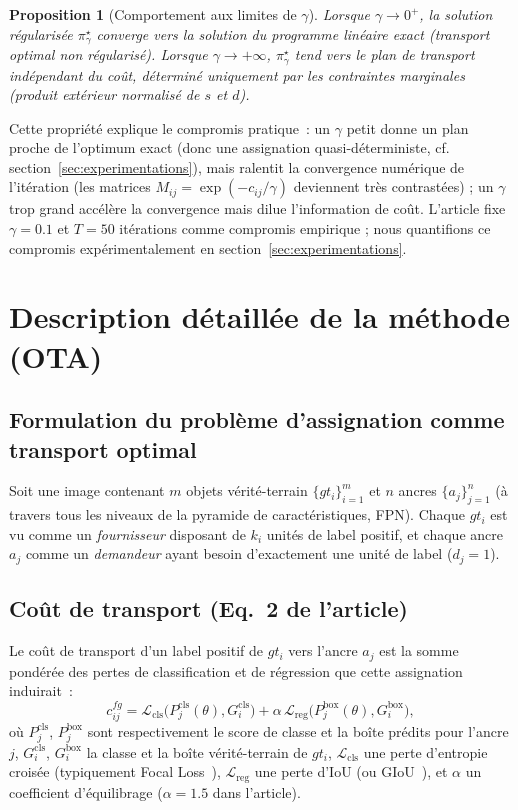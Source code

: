 \documentclass[11pt,a4paper]{article}
\newtheorem{proposition}{Proposition}
\begin{document}
\begin{proposition}[Comportement aux limites de $\gamma$]
Lorsque $\gamma \to 0^+$, la solution régularisée $\pi^\star_\gamma$ converge vers la solution du programme linéaire exact (transport optimal non régularisé). Lorsque $\gamma \to +\infty$, $\pi^\star_\gamma$ tend vers le plan de transport \emph{indépendant du coût}, déterminé uniquement par les contraintes marginales (produit extérieur normalisé de $s$ et $d$).
\end{proposition}
Cette propriété explique le compromis pratique~: un $\gamma$ petit donne un plan proche de l'optimum exact (donc une assignation quasi-déterministe, cf. section~\ref{sec:experimentations}), mais ralentit la convergence numérique de l'itération (les matrices $M_{ij}=\exp(-c_{ij}/\gamma)$ deviennent très contrastées) ; un $\gamma$ trop grand accélère la convergence mais dilue l'information de coût. L'article fixe $\gamma=0.1$ et $T=50$ itérations comme compromis empirique ; nous quantifions ce compromis expérimentalement en section~\ref{sec:experimentations}.

\section{Description détaillée de la méthode (OTA)}
\label{sec:methode}

\subsection{Formulation du problème d'assignation comme transport optimal}
Soit une image contenant $m$ objets vérité-terrain $\{gt_i\}_{i=1}^m$ et $n$ ancres $\{a_j\}_{j=1}^n$ (à travers tous les niveaux de la pyramide de caractéristiques, FPN). Chaque $gt_i$ est vu comme un \emph{fournisseur} disposant de $k_i$ unités de \og label positif\fg, et chaque ancre $a_j$ comme un \emph{demandeur} ayant besoin d'exactement une unité de label ($d_j=1$).

\subsection{Coût de transport (Eq.~2 de l'article)}
Le coût de transport d'un label positif de $gt_i$ vers l'ancre $a_j$ est la somme pondérée des pertes de classification et de régression que cette assignation induirait~:
\[
  c^{fg}_{ij} = \mathcal{L}_{\text{cls}}\big(P^{\text{cls}}_j(\theta), G^{\text{cls}}_i\big) + \alpha\, \mathcal{L}_{\text{reg}}\big(P^{\text{box}}_j(\theta), G^{\text{box}}_i\big),
\]
où $P^{\text{cls}}_j$, $P^{\text{box}}_j$ sont respectivement le score de classe et la boîte prédits pour l'ancre $j$, $G^{\text{cls}}_i$, $G^{\text{box}}_i$ la classe et la boîte vérité-terrain de $gt_i$, $\mathcal{L}_{\text{cls}}$ une perte d'entropie croisée (typiquement Focal Loss~\cite{lin2017focal}), $\mathcal{L}_{\text{reg}}$ une perte d'IoU (ou GIoU~\cite{rezatofighi2019giou}), et $\alpha$ un coefficient d'équilibrage ($\alpha=1.5$ dans l'article).
\end{document}
